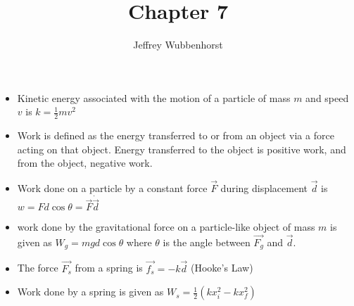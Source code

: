 \documentclass[10pt,letterpaper]{article}
\author{Jeffrey Wubbenhorst}
\title{Chapter 7}
\begin{document}
\maketitle

\begin{itemize}
\item Kinetic energy associated with the motion of a particle of mass $m$ and speed $v$ is $k=\frac{1}{2}mv^2$ 

\item Work is defined as the energy transferred to or from an object via a force acting on that object. Energy transferred to the object is positive work, and from the object, negative work. 
\item Work done on a particle by a constant force $\vec{F}$ during displacement $\vec{d}$ is $w=Fd\cos \theta = \vec{F}\dot \vec{d}$ 
\item work done by the gravitational force on a particle-like object of mass $m$ is given as $W_g=mgd\cos \theta$ where $\theta$ is the angle between $\vec{F_g}$ and $\vec{d}$. 
\item The force $\vec{F_s}$ from a spring is $\vec{f_s}=-k\vec{d}$ (Hooke's Law)
\item Work done by a spring is given as $W_s=\frac{1}{2}(kx_{i}^2-kx_f^2)$

\end{itemize}
\end{document}
